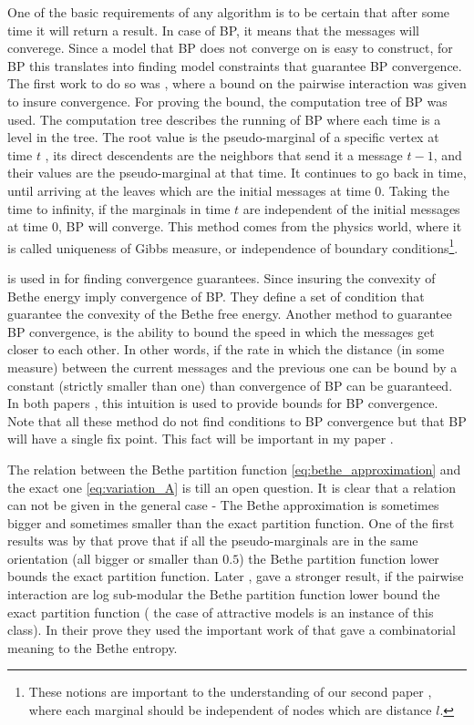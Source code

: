 One of the basic requirements of any algorithm is to be certain that after some time it will return a result.
In case of BP, it means that the messages will converege.
Since a model that BP does not converge on is easy to construct, for BP this translates into finding model constraints that guarantee BP convergence. 
The first work to do so was \cite{tatikonda2002loopy}, where a bound on the pairwise interaction was given to insure convergence.
For proving the bound, the computation tree of BP was used.
The computation tree describes the running of BP where each time is a level in the tree.
The root value is the pseudo-marginal of a specific vertex at time $t$ , its direct descendents are the neighbors that send it a message $t-1$, and their values are the pseudo-marginal at that time.
It continues to go back in time, until arriving at the leaves which are the initial messages at time $0$.
Taking the time to infinity, if the marginals in time $t$ are independent of the initial messages at time $0$, BP will converge.
This method comes from the physics world, where it is called uniqueness of Gibbs measure, or independence of boundary conditions\footnote{These notions are important to the understanding of our second paper \cite{heinemann2014inferning}, where each marginal should be independent of nodes which are distance $l$.}.

 is used in \cite{heskes2004uniqueness} for finding convergence guarantees.
Since insuring the convexity of Bethe energy imply convergence of BP.
They define a set of condition that guarantee the convexity of the Bethe free energy.
Another method to guarantee BP convergence,  is the ability to bound the speed in which the messages get closer to each other.
In other words, if the rate in which the distance (in some measure) between the current messages and the previous one can be bound by a constant (strictly smaller than one) than convergence of BP can be guaranteed.
In both papers \cite{mooij2007sufficient}, \cite{roosta2008convergence} this intuition is used to provide bounds for BP convergence.
Note that all these method do not find conditions to BP convergence but that BP will have a single fix point.
This fact will be important in my paper \cite{heinemann2012cannot}.

The relation between the Bethe partition function \eqref{eq:bethe_approximation} and the exact one \eqref{eq:variation_A} is till an open question.
It is clear that a relation can not be given in the general case - The Bethe approximation is sometimes bigger and sometimes smaller than the exact partition function.
One of the first results was by \cite{AlanNips2007} that prove that if all the pseudo-marginals are in the same orientation (all bigger or smaller than $0.5$) the Bethe partition function lower bounds the exact partition function.
Later \cite{RuozziNips2012},  gave a stronger result, if the pairwise interaction are log sub-modular the Bethe partition function lower bound the exact partition function ( the case of attractive models is an instance of this class).
In their prove they used the important work of \cite{vontobel2013counting} that gave a combinatorial meaning to the Bethe entropy.

